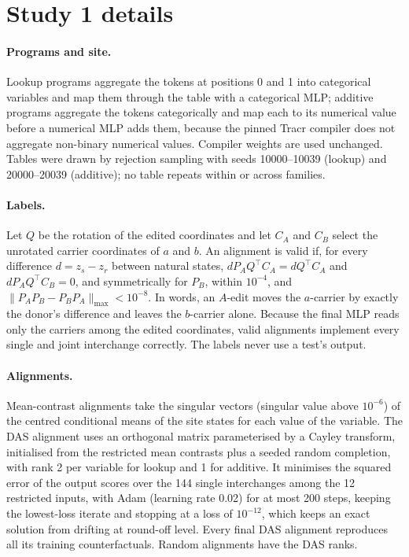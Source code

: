 \section{Study 1 details}\label{app:compiled}

\paragraph{Programs and site.}
Lookup programs aggregate the tokens at positions 0 and 1 into categorical variables and map them through the
table with a categorical MLP; additive programs aggregate the tokens categorically and map each to its numerical
value before a numerical MLP adds them, because the pinned Tracr compiler does not aggregate non-binary numerical
values. Compiler weights are used unchanged. Tables were drawn by rejection sampling with seeds 10000--10039
(lookup) and 20000--20039 (additive); no table repeats within or across families.

\paragraph{Labels.}
Let $Q$ be the rotation of the edited coordinates and let $C_A$ and $C_B$ select the unrotated carrier coordinates
of $a$ and $b$. An alignment is valid if, for every difference $d=z_s-z_r$ between natural states,
$dP_AQ^{\top}C_A=dQ^{\top}C_A$ and $dP_AQ^{\top}C_B=0$, and symmetrically for $P_B$, within $10^{-4}$, and
$\|P_AP_B-P_BP_A\|_{\max}<10^{-8}$. In words, an $A$-edit moves the $a$-carrier by exactly the donor's difference
and leaves the $b$-carrier alone. Because the final MLP reads only the carriers among the edited coordinates,
valid alignments implement every single and joint interchange correctly. The labels never use a test's output.

\paragraph{Alignments.}
Mean-contrast alignments take the singular vectors (singular value above $10^{-6}$) of the centred conditional means
of the site states for each value of the variable. The DAS alignment uses an orthogonal matrix parameterised by a
Cayley transform, initialised from the restricted mean contrasts plus a seeded random completion, with rank 2 per
variable for lookup and 1 for additive. It minimises the squared error of the output scores over the 144 single
interchanges among the 12 restricted inputs, with Adam (learning rate 0.02) for at most 200 steps, keeping the
lowest-loss iterate and stopping at a loss of $10^{-12}$, which keeps an exact solution from drifting at round-off
level. Every final DAS alignment reproduces all its training counterfactuals. Random alignments have the DAS ranks.

